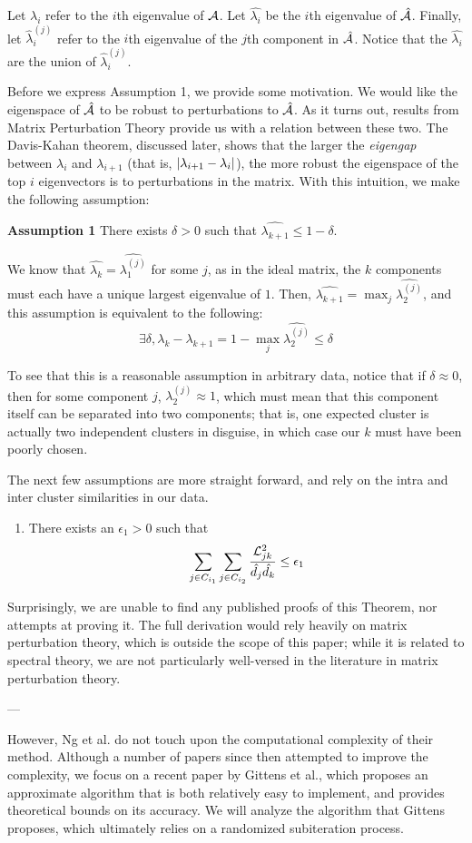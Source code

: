 Let $\lambda_i$ refer to the $i$th eigenvalue of $\mathcal{A}$. Let $\hat{\lambda_i}$
be the $i$th eigenvalue of $\hat{\mathcal{A}}$. Finally, let $\hat{\lambda}^{(j)}_i$
refer to the $i$th eigenvalue of the $j$th component in $\hat{\mathcal{A}}$. Notice that
the $\hat{\lambda_i}$ are the union of $\hat{\lambda}^{(j)}_i$.

Before we express Assumption 1, we provide some motivation. We would like
the eigenspace of $\hat{\mathcal{A}}$ to be robust to perturbations to $\hat{\mathcal{A}}$. As
it turns out, results from Matrix Perturbation Theory provide us with a relation
between these two. The Davis-Kahan theorem, discussed later, shows that the
larger the \textit{eigengap} between $\lambda_i$ and $\lambda_{i+1}$ (that is,
$\lvert\lambda_{i+1} - \lambda_i\rvert$), the more robust the eigenspace of the top
$i$ eigenvectors is to perturbations in the matrix. With this intuition, we
make the following assumption:

\textbf{Assumption 1} There exists $\delta > 0$ such that
$\hat{\lambda_{k+1}} \leq 1 - \delta$.

We know that $\hat{\lambda_k} = \hat{\lambda^{(j)}_1}$ for some $j$, as in the
ideal matrix, the $k$ components must each have a unique largest eigenvalue of
$1$. Then, $\hat{\lambda_{k+1}} = \max_j \hat{\lambda^{(j)}_2}$, and this
assumption is equivalent to the following:
\[ \exists \delta, \lambda_k - \lambda_{k+1} = 1 - \max_j \hat{\lambda^{(j)}_2} \leq \delta \]

To see that this is a reasonable assumption in arbitrary data, notice that if
$\delta \approx 0$, then for some component $j$, $\lambda^{(j)}_2 \approx 1$,
which must mean that this component itself can be separated into two components;
that is, one expected cluster is actually two independent clusters in disguise,
in which case our $k$ must have been poorly chosen.

The next few assumptions are more straight forward, and rely on the intra and
inter cluster similarities in our data.
\begin{enumerate}
\item
    There exists an $\epsilon_1 > 0$ such that
    \[ \sum_{j \in C_{i_1}} \sum_{j \in C_{i_2}} \frac{\mathcal{L}_{jk}^2}{\hat{d_j} \hat{d_k}} \leq \epsilon_1 \]
\end{enumerate}

Surprisingly, we are unable to find any published proofs of this Theorem, nor
attempts at proving it. The full derivation would rely heavily on matrix
perturbation theory, which is outside the scope of this paper; while it is
related to spectral theory, we are not particularly well-versed in the
literature in matrix perturbation theory.

---

However, Ng et al. do not touch upon the computational complexity of their
method. Although a number of papers since then attempted to improve the
complexity, we focus on a recent paper by Gittens et
al.\cite{gittens2013approximate}, which proposes an approximate algorithm that
is both relatively easy to implement, and provides theoretical bounds on its
accuracy. We will analyze the algorithm that Gittens proposes, which ultimately
relies on a randomized subiteration process.
